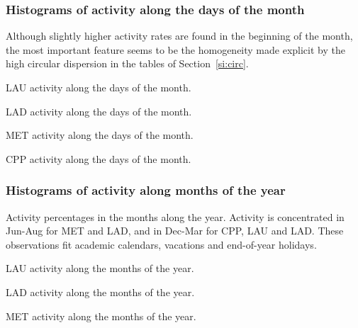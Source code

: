 \documentclass[%
 aip,
 jmp,%
 amsmath,amssymb,
 reprint,%
 floatfix,
]{revtex4-1}
\begin{document}
\FloatBarrier
\subsubsection{Histograms of activity along the days of the month}\label{si:monthdays}
Although slightly higher activity rates are found in the beginning of the month, the most important feature seems to be the homogeneity made explicit by the high circular dispersion in the tables of Section~\ref{si:circ}.
\begin{table}[!h]
	\caption{LAU activity along the days of the month.}
	\footnotesize
	
\label{tab:min}
\end{table}
\begin{table}[!h]
	\caption{LAD activity along the days of the month.}
	\footnotesize
	
\label{tab:min}
\end{table}
\begin{table}[!h]
	\caption{MET activity along the days of the month.}
	\footnotesize
	
\label{tab:min}
\end{table}
\begin{table}[!h]
	\caption{CPP activity along the days of the month.}
	\footnotesize
	
\label{tab:min}
\end{table}

\FloatBarrier
\subsubsection{Histograms of activity along months of the year}\label{si:months}
	Activity percentages in the months along the year.
	Activity is concentrated in Jun-Aug for MET and LAD, and in Dec-Mar for CPP, LAU and LAD.
	These observations fit academic calendars, vacations and end-of-year holidays.

\begin{table}[!h]
	\caption{LAU activity along the months of the year.}
	\footnotesize
	
\label{tab:min2}
\end{table}
\begin{table}[!h]
	\caption{LAD activity along the months of the year.}
	\footnotesize
	
\label{tab:min2}
\end{table}
\begin{table}[!h]
	\caption{MET activity along the months of the year.}
	\footnotesize
	
\label{tab:min2}
\end{table}
\end{document}
